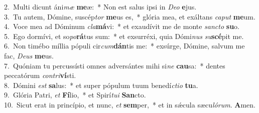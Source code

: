 {2.~}Multi dicunt áni\textit{mæ} \textbf{me}æ:~* Non est salus ipsi in \textit{De}\textit{o} \textbf{e}jus.\\
{3.~}Tu autem, Dómine, suscép\textit{tor} \textbf{me}us es,~* glória mea, et exáltans \textit{ca}\textit{put} \textbf{me}um.\\
{4.~}Voce mea ad Dóminum \textit{cla}\textbf{má}vi:~* et exaudívit me de monte \textit{san}\textit{cto} \textbf{su}o.\\
{5.~}Ego dormívi, et so\textit{po}\textbf{rá}tus sum:~* et exsurréxi, quia Dómi\textit{nus} \textit{su}\textbf{scé}pit me.\\
{6.~}Non timébo míllia pópuli cir\textit{cum}\textbf{dán}tis me:~* exsúrge, Dómine, salvum me fac, \textit{De}\textit{us} \textbf{me}us.\\
{7.~}Quóniam tu percussísti omnes adversántes mihi si\textit{ne} \textbf{cau}sa:~* dentes peccatórum \textit{con}\textit{tri}\textbf{ví}sti.\\
{8.~}Dómini \textit{est} \textbf{sa}lus:~* et super pópulum tuum benedí\textit{cti}\textit{o} \textbf{tu}a.\\
{9.~}Glória Patri, \textit{et} \textbf{Fí}lio,~* et Spirí\textit{tu}\textit{i} \textbf{San}cto.\\
{10.~}Sicut erat in princípio, et nunc, \textit{et} \textbf{sem}per,~* et in sǽcula sæcu\textit{ló}\textit{rum}. \textbf{A}men.\\
